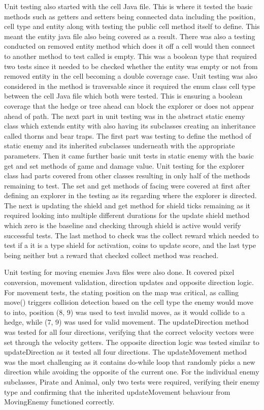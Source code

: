 \documentclass[12pt,letterpaper]{article}
\begin{document}
Unit testing also started with the cell Java file. This is where it tested the basic methods such as getters and setters being connected data including the position, cell type and entity along with testing the public cell method itself to define. This meant the entity java file also being covered as a result. There was also a testing conducted on removed entity method which does it off a cell would then connect to another method to test called is empty. This was a boolean type that required two tests since it needed to be checked whether the entity was empty or not from removed entity in the cell becoming a double coverage case. Unit testing was also considered in the method is traversable since it required the enum class cell type between the cell Java file which both were tested. This is ensuring a boolean coverage that the hedge or tree ahead can block the explorer or does not appear ahead of path. The next part in unit testing was in the abstract static enemy class which extends entity with also having its subclasses creating an inheritance called thorns and bear traps. The first part was testing to define the method of static enemy and its inherited subclasses underneath with the appropriate parameters. Then it came further basic unit tests in static enemy with the basic get and set methods of game and damage value. Unit testing for the explorer class had parts covered from other classes resulting in only half of the methods remaining to test. The set and get methods of facing were covered at first after defining an explorer in the testing as its regarding where the explorer is directed. The next is updating the shield and get method for shield ticks remaining as it required looking into multiple different durations for the update shield method which zero is the baseline and checking through shield is active would verify successful tests. The last method to check was the collect reward which needed to test if a it is a type shield for activation, coins to update score, and the last type being neither but a reward that checked collect method was reached. 

Unit testing for moving enemies Java files were also done. It covered pixel conversion, movement validation, direction updates and opposite direction logic. For movement tests, the stating position on the map was critical, as calling move() triggers collision detection based on the cell type the enemy would move to into, position (8, 9) was used to test invalid moves, as it would collide to a hedge, while (7, 9) was used for valid movement. The updateDirection method was tested for all four directions, verifying that the correct velocity vectors were set through the velocity getters. The opposite direction logic was tested similar to updateDirection as it tested all four directions. The updateMovement method was the most challenging as it contains do-while loop that randomly picks a new direction while avoiding the opposite of the current one. For the individual enemy subclasses, Pirate and Animal, only two tests were required, verifying their enemy type and confirming that the inherited updateMovement behaviour from MovingEnemy functioned correctly.
\end{document}
